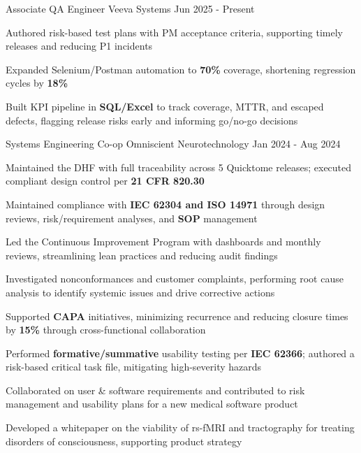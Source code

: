 \documentclass[11pt, a4paper]{russell}
\begin{document}
\begin{cventries}
\cventry
  {Associate QA Engineer} %
  {Veeva Systems} %
  {} %
  {Jun 2025 - Present} %
  {
    \begin{cvitems}
        \item {Authored risk-based test plans with PM acceptance criteria, supporting timely releases and reducing P1 incidents}
        \item {Expanded Selenium/Postman automation to \textbf{70\%} coverage, shortening regression cycles by \textbf{18\%}}
        \item {Built KPI pipeline in \textbf{SQL/Excel} to track coverage, MTTR, and escaped defects, flagging release risks early and informing go/no-go decisions}
    \end{cvitems}
  }

\cventry
  {Systems Engineering Co-op} %
  {Omniscient Neurotechnology} %
  {} %
  {Jan 2024 - Aug 2024} %
  {
    \begin{cvitems}
        \item {Maintained the DHF with full traceability across 5 Quicktome releases; executed compliant design control per \textbf{21 CFR 820.30}}
        \item {Maintained compliance with \textbf{IEC 62304 and ISO 14971} through design reviews, risk/requirement analyses, and \textbf{SOP} management}
        \item {Led the Continuous Improvement Program with dashboards and monthly reviews, streamlining lean \textbf{} practices and reducing audit findings}
        \item {Investigated nonconformances and customer complaints, performing root cause analysis to identify systemic issues and drive corrective actions}
      \item {Supported \textbf{CAPA} initiatives, minimizing recurrence and reducing closure times by \textbf{15\%} through cross-functional collaboration}
        \item {Performed \textbf{formative/summative} usability testing per \textbf{IEC 62366}; authored a risk-based critical task file, mitigating high-severity hazards}
        \item {Collaborated on user \& software requirements and contributed to risk management and usability plans for a new medical software product}
        \item {Developed a whitepaper on the viability of rs-fMRI and tractography for treating disorders of consciousness, supporting product strategy}
    \end{cvitems}
  }


\end{cventries}
\end{document}

